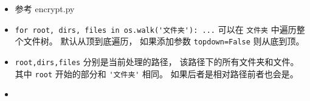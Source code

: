 
\begin{issues}
\issueDraft
\end{issues}

\begin{itemize}
\item 参考 encrypt.py
\item \verb`for root, dirs, files in os.walk('文件夹'): ...` 可以在 \verb`文件夹` 中遍历整个文件树。 默认从顶到底遍历， 如果添加参数 \verb`topdown=False` 则从底到顶。
\item \verb`root,dirs,files` 分别是当前处理的路径， 该路径下的所有文件夹和文件。 其中 \verb`root` 开始的部分和 \verb`'文件夹'` 相同。 如果后者是相对路径前者也会是。
\item 
\end{itemize}
